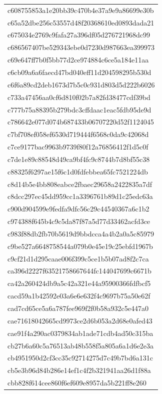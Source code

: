 \begin{tabular}{l}
c608755853a1e20bb39c470b4e37a9e9a86699e30b \\
c65a52dbe256c53557d48f20368610ed0893dada21 \\
c675034e2769c9fafa27a396df05d276721968dc99 \\
c686567407be529343ebe0d7230d987663ea399973 \\
c69e647ff7b0f5bb77d2ce974884c6ce5a184e11aa \\
c6cb09a6a6faecd47bd040eff11d204598295b530d \\
c6f6a89cd2deb1673d7b5c0c931d803d5d222b6026 \\
c733a47456aa0cf6d810f02b7a82fd38477cdf39bd \\
c777b75a88395b279bdc3cffdaac1eac5fdb95de9d \\
c786642e077d074b687433b06707220d52f1124045 \\
c7bf708ef058ef6530d719444f6568c0da9c42068d \\
c7ce9177bac9963b9739f80f12a76856412f1d5c0f \\
c7de1e89c88548d49ca9bf4fc9c8744b7d8bf55c38 \\
c88325f6297ae15f6c1d0fdfebbea65fc7521224db \\
c8d14b5e4bb808eabce2fbaec29658a2422835a7df \\
c8dcc297ec45dd959cc1a3396761b89d1c25edc63a \\
c900d904599e9fedfa9dfc56c29c44540367a6c1b2 \\
c974388f645b4c9c5da87f87a5d77d33462acfd3ce \\
c983f88db2fb70b5619d9bbdcca4a4b2a0a5c85979 \\
c9be527a6648758544a079b0e45e19c25ebfd1967b \\
c9cf21d1d295caae006f399c5ce1b5b07ad8f2c7ca \\
ca396d2227f63521758667644fc144047699c6671b \\
ca42a260424db9a5c42a321e44a95900366fdfbcf5 \\
cacd59a1b42592e03a6e6e632f4c9697b75a50e62f \\
cad7cd65ce5a6a787fee969f2f0b58a932c5e447a0 \\
cae71618042665cd9973ce2d6b053a2d68e0afed43 \\
cae91f4a290ac0379834ab1ade71cdb4ad50c315ba \\
cb27b6a60c5a76513ab48b558f5a805a6a1d6e2e3a \\
cb4951950d2cf3cc35c92714275d7c49b7bd6a131c \\
cb5e3b96d84b286e14ef1c4f2b321941aa26d1f88a \\
cbb828f614cee860f6ef609e8957da5b221ff8e260 \\

\end{tabular}
